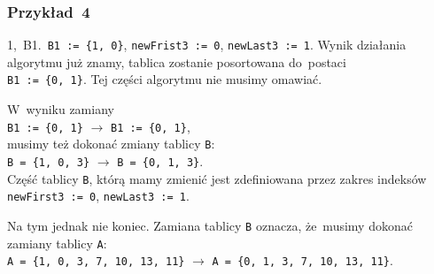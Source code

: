 \documentclass[10pt,t]{beamer}
\begin{document}
\begin{frame}
  \frametitle{Przykład~4}


  1,~B1.~\texttt{B1 := \{1, 0\}}, \texttt{newFrist3 := 0},
  \texttt{newLast3 := 1}. Wynik działania algorytmu już znamy, tablica
  zostanie posortowana do~postaci \\
  \texttt{B1 := \{0, 1\}}. Tej części algorytmu nie musimy omawiać.

  W~wyniku zamiany \\
  \texttt{B1 := \{0, 1\}} $\to$ \texttt{B1 := \{0, 1\}}, \\
  musimy też dokonać zmiany tablicy \texttt{B}: \\
  \texttt{B = \{1, 0, 3\}} $\to$ \texttt{B = \{0, 1, 3\}}. \\
  Część tablicy \texttt{B}, którą mamy zmienić jest zdefiniowana przez
  zakres indeksów \texttt{newFirst3 := 0}, \texttt{newLast3 := 1}.

  Na tym jednak nie koniec. Zamiana tablicy \texttt{B} oznacza,
  że~musimy dokonać zamiany tablicy \texttt{A}: \\
  \texttt{A = \{1, 0, 3, 7, 10, 13, 11\}} $\to$
  \texttt{A = \{0, 1, 3, 7, 10, 13, 11\}}.







\end{frame}
\end{document}
